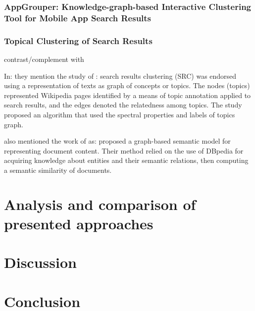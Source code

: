 \documentclass[runningheads]{llncs}
\begin{document}
\subsubsection{AppGrouper: Knowledge-graph-based Interactive Clustering Tool for Mobile App Search Results} \cite{Chang}


\subsubsection{Topical Clustering of Search Results}
\cite{Scaiella} contrast/complement with \cite{Schuhmacher}

In: \cite{Elbattah} they mention the study of \cite{Scaiella}: search results clustering (SRC) was endorsed using a representation of texts as graph of concepts or topics. The nodes (topics) represented Wikipedia pages identified by a means of topic annotation applied to search results, and the edges denoted the relatedness among topics. The study proposed an algorithm that used the spectral properties and labels of topics graph. 

\cite{Elbattah} also mentioned the work of \cite{Schuhmacher} as: proposed a graph-based semantic model for representing document content. Their method relied on the use of DBpedia for acquiring knowledge about entities and their semantic relations, then computing a semantic similarity of documents.


\section{Analysis and comparison of presented approaches} \label{analysis}

\section{Discussion} \label{discussion}
\section{Conclusion} \label{conclusion}
\end{document}
